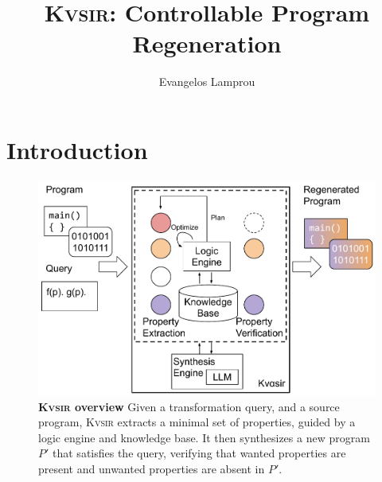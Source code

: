 \documentclass[noacm,sigplan]{acmart}
\newcommand{\sys}{{\scshape Kv{\textalpha}sir}\xspace}
\begin{document}
\title{\sys: Controllable Program Regeneration}
\author{Evangelos Lamprou}



\begin{abstract}
\end{abstract}
\maketitle

\section{Introduction}
\begin{figure}[t]
  \includegraphics[width=\columnwidth]{figs/kvasir_overview.pdf}
  \caption{\textbf{\sys overview}
Given a transformation query, and a source program, \sys extracts a minimal set
  of properties,
  guided by a logic engine and knowledge base.
  It then synthesizes a new program $P'$ that satisfies the query, verifying
  that wanted properties are present and unwanted properties are absent in $P'$.
}
\end{figure}


\end{document}
